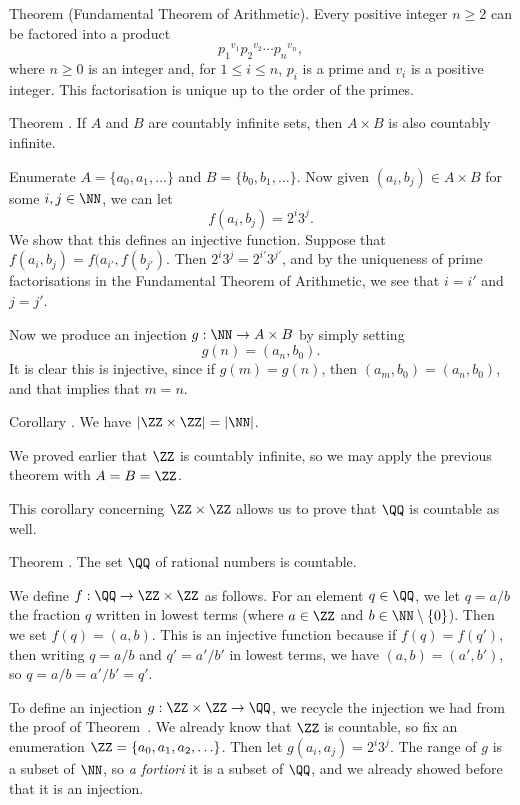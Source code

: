 \parenproclaim Theorem {\advthm} (Fundamental Theorem of Arithmetic). Every positive
integer $n\ge 2$ can be factored into a product
$${p_1}^{v_1} {p_2}^{v_2}\cdots {p_n}^{v_n},$$
where $n\ge 0$ is an integer and, for $1\le i\le n$, $p_i$ is a prime and $v_i$ is a positive integer.
This factorisation is unique up to the order of the primes.\slug

\edef\thmcartesiancountable{\the\thmcount}
\proclaim Theorem \advthm. If $A$ and $B$ are countably infinite sets,
then $A\times B$ is also countably infinite.

\proof
Enumerate $A = \{a_0, a_1, \ldots\}$ and $B = \{b_0, b_1, \ldots\}$. Now given
$(a_i, b_j)\in A\times B$ for some $i,j\in \NN$, we can let
$$f(a_i, b_j) = 2^i3^j.$$
We show that this defines an injective function. Suppose that $f(a_i, b_j) = f(a_{i'}, f(b_{j'}).$
Then $2^i3^j = 2^{i'} 3^{j'}$, and by the uniqueness of prime factorisations in the Fundamental
Theorem of Arithmetic, we see that $i = i'$ and $j=j'$.

Now we produce an injection $g : \NN\to A\times B$ by simply setting
$$g(n) = (a_n, b_0).$$
It is clear this is injective, since if $g(m) = g(n)$, then $(a_m, b_0) = (a_n, b_0)$, and
that implies that $m=n$.\slug

\edef\corzedtwocountable{\the\thmcount}
\proclaim Corollary \advthm. We have $|\ZZ\times \ZZ| = |\NN|$.

\proof
We proved earlier that $\ZZ$ is countably infinite, so we may apply the previous theorem with $A = B = \ZZ$.\slug

This corollary concerning $\ZZ\times \ZZ$ allows us to prove that $\QQ$ is countable as well.

\proclaim Theorem \advthm. The set $\QQ$ of rational numbers is countable.

\proof We define $f:\QQ\to \ZZ\times \ZZ$ as follows. For an element $q\in \QQ$, we let $q = a/b$ the fraction $q$
written in lowest terms (where $a\in \ZZ$ and $b\in \NN\setminus\{0\}$). Then we set $f(q) = (a,b)$.
This is an injective function because if $f(q) = f(q')$, then writing $q = a/b$ and $q' = a'/b'$ in lowest
terms, we have $(a,b) = (a',b')$, so $q = a/b = a'/b' = q'$.

To define an injection $g: \ZZ\times \ZZ\to \QQ$, we recycle the injection we had from the proof
of Theorem~{\thmcartesiancountable}. We already know that $\ZZ$ is countable, so fix an enumeration
$\ZZ = \{a_0, a_1, a_2, \ldots\}$. Then let $g(a_i, a_j) = 2^i 3^j$. The range of $g$ is a subset of $\NN$,
so {\it a fortiori} it is a subset of $\QQ$, and we already showed before that it is an injection.

